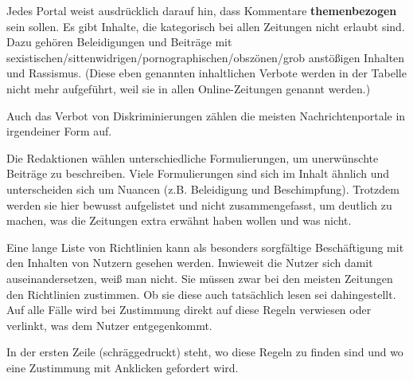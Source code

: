 Jedes Portal weist ausdrücklich darauf hin, dass Kommentare {\bfseries
themenbezogen} sein sollen.  Es gibt Inhalte, die kategorisch bei allen
Zeitungen nicht erlaubt sind. Dazu gehören Beleidigungen und Beiträge mit
se\-xi\-sti\-schen/sit\-ten\-wi\-dri\-gen/por\-no\-gra\-phi\-schen/obs\-zö\-nen/grob
anstößigen Inhalten und Rassismus. (Diese eben genannten inhaltlichen Verbote
werden in der Tabelle nicht mehr aufgeführt, weil sie in allen Online-Zeitungen
genannt werden.)

Auch das Verbot von Diskriminierungen zählen die meisten Nachrichtenportale in
irgendeiner Form auf.

Die Redaktionen wählen unterschiedliche Formulierungen, um unerwünschte Beiträge
zu beschreiben. Viele Formulierungen sind sich im Inhalt ähnlich  und
unterscheiden sich um Nuancen (z.B. Beleidigung und Beschimpfung). Trotzdem
werden sie hier bewusst aufgelistet und nicht zusammengefasst, um deutlich zu
machen, was die Zeitungen extra erwähnt haben wollen und was nicht.

Eine lange Liste von Richtlinien kann als besonders sorgfältige Beschäftigung
mit den Inhalten von Nutzern gesehen werden. Inwieweit die Nutzer sich damit
auseinandersetzen, weiß man nicht. Sie müssen zwar bei den meisten Zeitungen den
Richtlinien zustimmen. Ob sie diese auch tatsächlich lesen sei dahingestellt.
Auf alle Fälle wird bei Zustimmung direkt auf diese Regeln verwiesen oder
verlinkt, was dem Nutzer entgegenkommt.

In der ersten Zeile (schräggedruckt) steht, wo diese Regeln zu finden sind und
wo eine Zustimmung mit Anklicken gefordert wird.

\pagebreak

